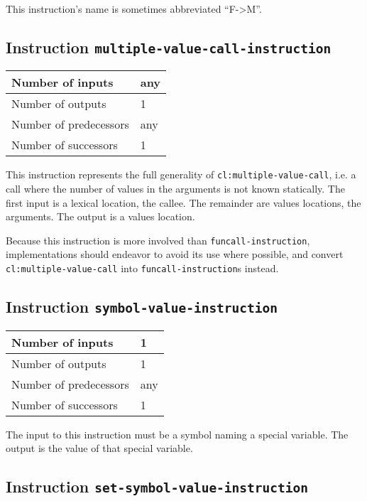 This instruction's name is sometimes abbreviated ``F->M''.

\subsection{Instruction \texttt{multiple-value-call-instruction}}
\label{mir-instruction-multiple-value-call}

\begin{tabular}{|l|l|}
  \hline
  Number of inputs & any\\
  \hline
  Number of outputs & 1\\
  \hline
  Number of predecessors & any\\
  \hline
  Number of successors & 1\\
  \hline
\end{tabular}

This instruction represents the full generality of
\texttt{cl:multiple-value-call}, i.e. a call where the number of
values in the arguments is not known statically. The first input is
a lexical location, the callee. The remainder are values locations,
the arguments. The output is a values location.

Because this instruction is more involved than
\texttt{funcall-instruction}, implementations should endeavor to
avoid its use where possible, and convert
\texttt{cl:multiple-value-call} into \texttt{funcall-instruction}s
instead.

\subsection{Instruction \texttt{symbol-value-instruction}}
\label{mir-instruction-symbol-value}

\begin{tabular}{|l|l|}
\hline
Number of inputs & 1\\
\hline
Number of outputs & 1\\
\hline
Number of predecessors & any\\
\hline
Number of successors & 1\\
\hline
\end{tabular}

The input to this instruction must be a symbol naming a special
variable.  The output is the value of that special variable.

\subsection{Instruction \texttt{set-symbol-value-instruction}}
\label{mir-instruction-set-symbol-value}

